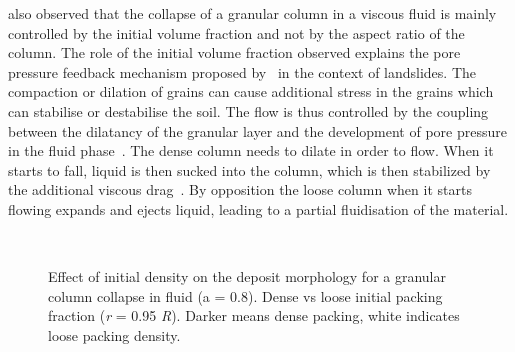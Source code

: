 \citet{Rondon2011} also observed that the collapse of a granular column in a 
viscous fluid is mainly controlled by the initial volume fraction and not by 
the aspect ratio of the column. The role of the initial volume fraction 
observed explains the pore pressure feedback mechanism proposed 
by~\citep{Schaeffer2008,Iverson2000} in the context of landslides. The 
compaction or dilation of grains can cause additional stress in the grains 
which can stabilise or destabilise the soil. The flow is thus controlled by the 
coupling between the dilatancy of the granular layer and the development of 
pore pressure in the fluid phase~\citep{Pailha2008}. The dense column needs to 
dilate in order to flow. When it starts to fall, liquid is then sucked into the 
column, which is then stabilized by the additional viscous 
drag~\citep{Rondon2011,Topin2012}. By opposition the loose column when 
it starts flowing expands and ejects liquid, leading to a partial fluidisation 
of the material.

\begin{figure}[h]
\centering
{}\\
\caption[Effect of initial density on the deposit morphology
for a granular column collapse in fluid (a = 0.8).]{Effect of initial density 
on the deposit morphology
for a granular column collapse in fluid (a = 0.8). Dense vs loose initial 
packing fraction (\textit{r} = 0.95 \textit{R}). Darker means dense packing, 
white indicates 
loose 
packing density.}
\label{fig:Dense_Loose_PT}
\end{figure}


